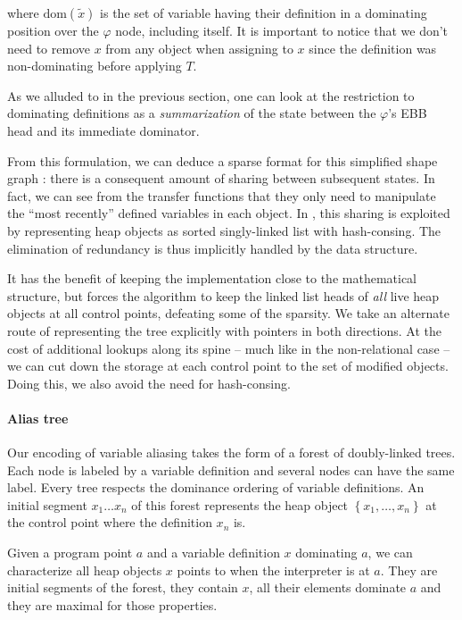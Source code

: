 \documentclass[11pt]{article}
\renewcommand{\phi}{\varphi}
\begin{document}
where $\text{dom}(\tilde{x})$ is the set of variable having their definition in a dominating position over the $\phi$ node, including itself. It is important to notice that we don't need to remove $x$ from any object when assigning to $x$ since the definition was non-dominating before applying $T$.

As we alluded to in the previous section, one can look at the restriction to dominating definitions as a \emph{summarization} of the state between the $\phi$'s EBB head and its immediate dominator.

From this formulation, we can deduce a sparse format for this simplified shape graph : there is a consequent amount of sharing between subsequent states. In fact, we can see from the transfer functions that they only need to manipulate the ``most recently'' defined variables in each object.
In \cite{ssa-alias}, this sharing is exploited by representing heap objects as sorted singly-linked list with hash-consing. The elimination of redundancy is thus implicitly handled by the data structure.

It has the benefit of keeping the implementation close to the mathematical structure, but forces the algorithm to keep the linked list heads of \emph{all} live heap objects at all control points, defeating some of the sparsity.
We take an alternate route of representing the tree explicitly with pointers in both directions. At the cost of additional lookups along its spine -- much like in the non-relational case -- we can cut down the storage at each control point to the set of modified objects. Doing this, we also avoid the need for hash-consing.

\paragraph{Alias tree} Our encoding of variable aliasing takes the form of a forest of doubly-linked trees.
Each node is labeled by a variable definition and several nodes can have the same label.
Every tree respects the dominance ordering of variable definitions.
An initial segment $x_1\dots x_n$ of this forest represents the heap object $\left\{x_1,\dots,x_n\right\}$ at the control point where the definition $x_n$ is.

Given a program point $a$ and a variable definition $x$ dominating $a$, we can characterize all heap objects $x$ points to when the interpreter is at $a$. They are initial segments of the forest, they contain $x$, all their elements dominate $a$ and they are maximal for those properties.
\end{document}
